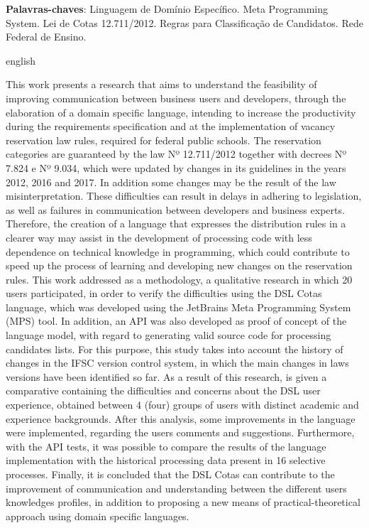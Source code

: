\begin{resumo}[Resumo]

 \vspace{\onelineskip}
    
 \noindent
 \textbf{Palavras-chaves}: Linguagem de Domínio Específico. Meta Programming System. Lei de Cotas 12.711/2012. Regras para Classificação de Candidatos. Rede Federal de Ensino.
\end{resumo}



\begin{resumo}[Abstract]
\begin{otherlanguage*}{english}

 \noindent
This work presents a research that aims to understand the feasibility of improving communication between business users and developers, through the elaboration of a domain specific language, intending to increase the productivity during the requirements specification and at the implementation of vacancy reservation law rules, required for federal public schools. The reservation categories are guaranteed by the law Nº 12.711/2012 together with decrees Nº 7.824 e Nº 9.034, which were updated by changes in its guidelines in the years 2012, 2016 and 2017. In addition some changes may be the result of the law misinterpretation. These difficulties can result in delays in adhering to legislation, as well as failures in communication between developers and business experts. Therefore, the creation of a language that expresses the distribution rules in a clearer way may assist in the development of processing code with less dependence on technical knowledge in programming, which could contribute to speed up the process of learning and developing new changes on the reservation rules. This work addressed as a methodology, a qualitative research in which 20 users participated, in order to verify the difficulties using the DSL Cotas language, which was developed using the JetBrains Meta Programming System (MPS) tool. In addition, an API was also developed as proof of concept of the language model, with regard to generating valid source code for processing candidates lists. For this purpose, this study takes into account the history of changes in the \gls{IFSC} version control system, in which the main changes in laws versions have been identified so far. As a result of this research, is given a comparative containing the difficulties and concerns about the DSL user experience, obtained between 4 (four) groups of users with distinct academic and experience backgrounds. After this analysis, some improvements in the language were implemented, regarding the users comments and suggestions. Furthermore, with the \gls{API} tests, it was possible to compare the results of the language implementation with the historical processing data present in 16 selective processes. Finally, it is concluded that the DSL Cotas can contribute to the improvement of communication and understanding between the different users knowledges profiles, in addition to proposing a new means of practical-theoretical approach using domain specific languages. 
\end{otherlanguage*}
\end{resumo}
